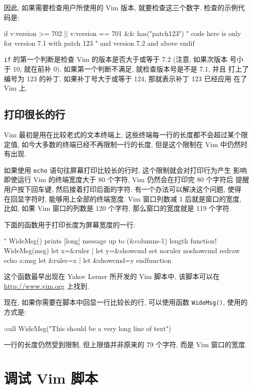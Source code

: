 因此, 如果需要检查用户所使用的 Vim 版本, 就要检查这三个数字. 检查的示例代码是:
\begin{vimcode}
if v:version >= 702 || v:version == 701 && has("patch123")
    " code here is only for version 7.1 with patch 123
    " and version 7.2 and above
endif
\end{vimcode}
\texttt{if} 的第一个判断是检查 Vim 的版本是否大于或等于 7.2 (注意, 如果次版本
号小于 10, 就在前补 0). 如果第一个判断不满足, 就检查版本号是不是 7.1, 并且
打上了编号为 123 的补丁. 如果补丁号大于或等于 124, 那就表示补丁 123 已经应用
在了 Vim 上.

\subsection{打印很长的行}
\label{subsec:printing_longer_lines}

Vim 最初是用在比较老式的文本终端上, 这些终端每一行的长度都不会超过某个限定值,
如今大多数的终端已经不再限制一行的长度, 但是这个限制在 Vim 中仍然时有出现.

如果使用 \texttt{echo} 语句往屏幕打印比较长的行时, 这个限制就会对打印行为产生
影响. 即使运行 Vim 的终端宽度大于 80 个字符, Vim 仍然会在打印完 80 个字符后
提醒用户按下回车键, 然后接着打印后面的字符. 有一个办法可以解决这个问题, 使得
在回显字符时, 能够用上全部的终端宽度. Vim 窗口列数减 1 后就是窗口的宽度,
比如, 如果 Vim 窗口的列数是 120 个字符, 那么窗口的宽度就是 119 个字符.

下面的函数用于打印长度为屏幕宽度的一行:
\begin{vimcode}
" WideMsg() prints [long] message up to (&columns-1) length
function! WideMsg(msg)
    let x=&ruler | let y=&showcmd
    set noruler noshowcmd
    redraw
    echo a:msg
    let &ruler=x | let &showcmd=y
endfunction
\end{vimcode}

\begin{warning}
    这个函数最早出现在 Yakov Lerner 所开发的 Vim 脚本中, 该脚本可以在
    \url{http://www.vim.org} 上找到.
\end{warning}

现在, 如果你需要在脚本中回显一行比较长的行, 可以使用函数 \texttt{WideMsg()},
使用的方式是:
\begin{vimcode}
:call WideMsg("This should be a very long line of text")
\end{vimcode}
一行的长度仍然受到限制, 但上限值并非原来的 79 个字符, 而是 Vim 窗口的宽度.

\section{调试 Vim 脚本}
\label{sec:debugging_vim_scripts}


